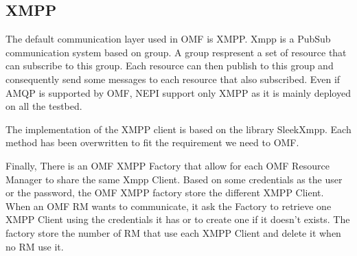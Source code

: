 \subsection{XMPP}

The default communication layer used in OMF is XMPP. Xmpp is a PubSub communication system based on group. A group respresent a set of resource that can subscribe to this group. Each resource can then publish to this group and consequently send some messages to each resource that also subscribed.
Even if AMQP is supported by OMF, NEPI support only XMPP as it is mainly deployed on all the testbed.

The implementation of the XMPP client is based on the library SleekXmpp. Each method has been overwritten to fit the requirement we need to OMF. 

Finally, There is an OMF XMPP Factory that allow for each OMF Resource Manager to share the same Xmpp Client. Based on some credentials as the user or the password, the OMF XMPP factory store the different XMPP Client. When an OMF RM wants to communicate, it ask the Factory to retrieve one XMPP Client using the credentials it has or to create one if it doesn't exists. The factory store the number of RM that use each XMPP Client and delete it when no RM use it.









